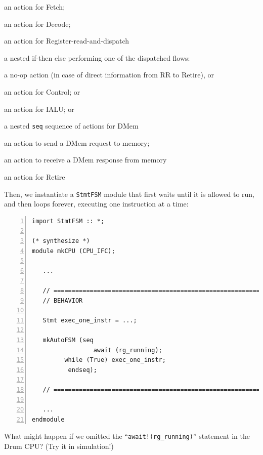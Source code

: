 \begin{tightlist}
  \item an action for Fetch;
  \item an action for Decode;
  \item an action for Register-read-and-dispatch
  \item a nested if-then else performing one of the dispatched flows:
    \begin{tightlist}
      \item a no-op action (in case of direct information from RR to Retire), or
      \item an action for Control; or
      \item an action for IALU; or
      \item a nested \verb|seq| sequence of actions for DMem
        \begin{tightlist}
          \item an action to send a DMem request to memory;
          \item an action to receive a DMem response from memory
        \end{tightlist}
    \end{tightlist}
  \item an action for Retire
\end{tightlist}

Then, we instantiate a \verb|StmtFSM| module that first waits until it
is allowed to run, and then loops forever, executing one instruction
at a time:

{\small
\begin{Verbatim}[frame=single, numbers=left]
import StmtFSM :: *;

(* synthesize *)
module mkCPU (CPU_IFC);

   ...

   // ================================================================
   // BEHAVIOR

   Stmt exec_one_instr = ...;

   mkAutoFSM (seq
                 await (rg_running);
		 while (True) exec_one_instr;
	      endseq);

   // ================================================================

   ...
endmodule
\end{Verbatim}
}

\hdivider

\Exercise

What might happen if we omitted the ``{\tt await!(rg\_running)}''
statement in the Drum CPU? (Try it in simulation!)

